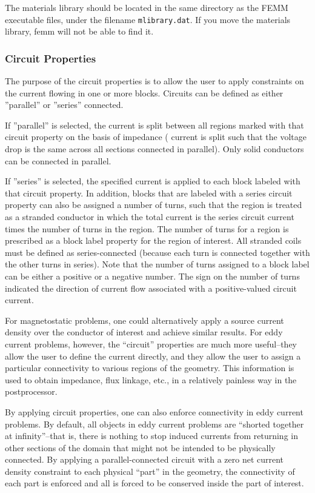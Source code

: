 \documentclass[12pt]{report}
\begin{document}
The materials library should be located in the same directory as
the FEMM executable files, under the filename \verb+mlibrary.dat+.
If you move the materials library, femm will not be able to find
it.

\subsubsection{Circuit Properties}

The purpose of the circuit properties is to allow the user
to apply constraints on the current flowing in one
or more blocks. Circuits can be defined as either ''parallel'' or
''series'' connected.

If ''parallel'' is selected, the current is
split between all regions marked with that circuit property on the
basis of impedance ({\em} current is split such that the voltage drop
is the same across all sections connected in parallel).  Only solid
conductors can be connected in parallel.

If ''series'' is selected, the specified current is applied to each block
labeled with that circuit property.  In addition, blocks that are
labeled with a series circuit property can also be assigned a number of
turns, such that the region is treated as a stranded conductor in which
the total current is the series circuit current times the number of turns
in the region.  The number of turns for a region is prescribed as a block
label property for the region of interest.  All stranded coils must be
defined as series-connected (because each turn is connected together with
the other turns in series).  Note that the number of turns assigned to
a block label can be either a positive or a negative number.  The sign
on the number of turns indicated the direction of current flow associated
with a positive-valued circuit current.

For magnetostatic problems, one could alternatively apply a source
current density over the conductor of interest and achieve similar
results. For eddy current problems, however, the ``circuit''
properties are much more useful--they allow the user to define the
current directly, and they allow the user to assign a particular connectivity
to various regions of the geometry.  This information is used to
obtain impedance, flux linkage, etc., in a relatively painless way
in the postprocessor.

By applying circuit properties, one can also enforce connectivity
in eddy current problems. By default, all objects in eddy current
problems are ``shorted together at infinity''--that is, there is
nothing to stop induced currents from returning in other sections
of the domain that might not be intended to be physically
connected.  By applying a parallel-connected circuit with a zero net current density
constraint to each physical ``part'' in the geometry, the
connectivity of each part is enforced and all is forced to be
conserved inside the part of interest.
\end{document}
